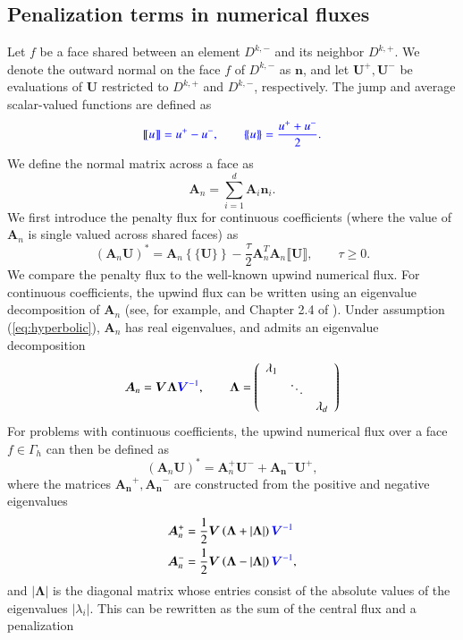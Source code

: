 \documentclass[preprint,10pt]{elsarticle}
\newcommand{\LRp}[1]{\left( #1 \right)}
\newcommand{\LRb}[1]{\left| #1 \right|}
\newcommand{\LRc}[1]{\left\{ #1 \right\}}
\newcommand{\jump}[1] {\ensuremath{\llbracket#1\rrbracket}}
\newcommand{\avg}[1] {\ensuremath{\LRc{\!\{#1\}\!}}}
\newcommand{\Gh}{\Gamma_h}
\newcommand{\note}[1]{{\color{blue}#1}}
\begin{document}
\subsection{Penalization terms in numerical fluxes}
\label{sec:scaletau}

Let $f$ be a face \note{shared between} an element $D^{k,-}$ and its neighbor $D^{k,+}$.  We denote the outward normal on the face $f$ of $D^{k,-}$ as $\bm{n}$, and let $\bm{U}^+, \bm{U}^-$ be evaluations of $\bm{U}$ restricted to $D^{k,+}$ and $D^{k,-}$, respectively.  The jump and average scalar-valued functions are defined as 
\[
\note{\jump{u} = u^+ - u^-, \qquad \avg{u} = \frac{{u}^+ + u^-}{2}.}
\]
We define the normal matrix across a face as
\[
{\bm{A}}_n = \sum_{i=1}^d {\bm{A}_i\bm{n}_i}.
\]
\note{We first introduce the penalty flux for continuous coefficients (where the value of $\bm{A}_n$ is single valued across shared faces) as}
\[
(\bm{A}_n\bm{U})^* = \bm{A}_n\avg{\bm{U}} - \frac{\tau}{2} \bm{A}_n^T \bm{A}_n\jump{\bm{U}}, \qquad \tau \geq 0.
\]
We compare the penalty flux to the well-known upwind numerical flux.  For \note{continuous coefficients, the upwind flux can be written using an eigenvalue decomposition of $\bm{A}_n$ (see, for example, \cite{ye2016discontinuous} and Chapter 2.4 of \cite{hesthaven2007nodal})}.  
Under assumption (\ref{eq:hyperbolic}), ${\bm{A}}_n$ has real eigenvalues, and admits an eigenvalue decomposition
\[
\bm{A}_n = \bm{V}{\bm{\Lambda}}\note{\bm{V}^{-1}}, \qquad \bm{\Lambda} = 
\left(\begin{array}{ccc}
\lambda_1 & & \\
& \ddots & \\
& & \lambda_d
\end{array}\right)
\]
For problems with continuous coefficients, the upwind numerical flux over a face $f \in \Gh$ can then be defined  as
\[
(\bm{A}_n\bm{U})^* = \bm{A}_n^+\bm{U}^- + \bm{A_n}^- \bm{U}^+,
\]
where the matrices $\bm{A_n}^+,\bm{A_n}^-$ are constructed from the positive and negative eigenvalues 
\begin{align*}
\bm{A}_n^+ &= \frac{1}{2}\bm{V} \LRp{\bm{\Lambda} + \LRb{\bm{\Lambda}}} \note{\bm{V}^{-1}}\\
\bm{A}_n^- &= \frac{1}{2}\bm{V} \LRp{\bm{\Lambda} - \LRb{\bm{\Lambda}}} \note{\bm{V}^{-1}},
\end{align*}
and $\LRb{\bm{\Lambda}}$ is the diagonal matrix whose entries consist of the absolute values of the eigenvalues $\LRb{\lambda_i}$.  This can be rewritten as the sum of the central flux and a penalization
\end{document}
